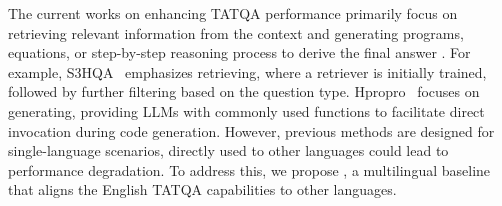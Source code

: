 The current works on enhancing TATQA performance primarily focus on retrieving relevant information from the context \cite{luo2023hrot,bardhan2024ttqars,glenn-etal-2024-blendsql} and generating programs, equations, or step-by-step reasoning process to derive the final answer \cite{tonglet-etal-2023-seer,TAT-LLM,fatemi2024three-agent}.
For example, S3HQA~\cite{lei-etal-2023-s3hqa} emphasizes retrieving, where a retriever is initially trained, followed by further filtering based on the question type. 
Hpropro~\cite{shi-etal-2024-hpropro} focuses on generating, providing LLMs with commonly used functions to facilitate direct invocation during code generation.
However, previous methods are designed for single-language scenarios, directly used to other languages could lead to performance degradation.
To address this, we propose \ourmethod, a multilingual baseline that aligns the English TATQA capabilities to other languages. 
